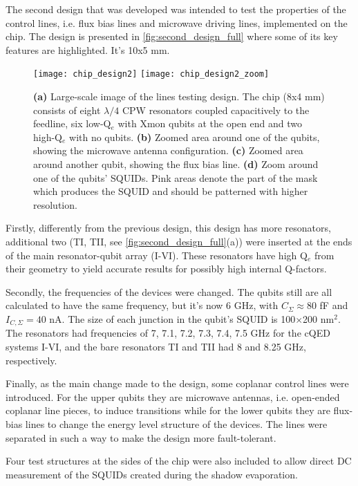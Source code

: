 \documentclass[12pt, twoside]{report}
\numberwithin{equation}{section}
\begin{document}
The second design that was developed was intended to test the properties of the control lines, i.e. flux bias lines and microwave driving lines, implemented on the chip. The design is presented in \autoref{fig:second_design_full} where some of its key features are highlighted. It's 10x5 mm.

\begin{figure}[h!]
\centering
\texttt{[image: chip\_design2]}
\texttt{[image: chip\_design2\_zoom]}
\caption{\textbf{(a)} Large-scale image of the lines testing design. The chip (8x4 mm) consists of eight $\lambda/4$ CPW resonators coupled capacitively to the feedline, six low-Q$_e$ with Xmon qubits at the open end and two high-Q$_e$ with no qubits. \textbf{(b)} Zoomed area around one of the qubits, showing the microwave antenna configuration. \textbf{(c)} Zoomed area around another qubit, showing the flux bias line. \textbf{(d)} Zoom around one of the qubits' SQUIDs. Pink areas denote the part of the mask which produces the SQUID and should be patterned with higher resolution.}
\label{fig:second_design_full}
\end{figure}

Firstly, differently from the previous design, this design has more resonators, additional two (TI, TII, see \autoref{fig:second_design_full}(a)) were inserted at the ends of the main resonator-qubit array (I-VI). These resonators have high Q$_e$ from their geometry to yield accurate results for possibly high internal Q-factors.

Secondly, the frequencies of the devices were changed. The qubits still are all calculated to have the same frequency, but it's now 6 GHz, with $C_\Sigma \approx 80$ fF and $I_{C, \Sigma} = 40$ nA. The size of each junction in the qubit's SQUID is 100$\times$200 nm$^2$. The resonators had frequencies of 7, 7.1, 7.2, 7.3, 7.4, 7.5 GHz for the cQED systems I-VI, and the bare resonators TI and TII had 8 and 8.25 GHz, respectively.

Finally, as the main change made to the design, some coplanar control lines were introduced. For the upper qubits they are microwave antennas, i.e. open-ended coplanar line pieces, to induce transitions while for the lower qubits they are flux-bias lines to change the energy level structure of the devices. The lines were separated in such a way to make the design more fault-tolerant.

Four test structures at the sides of the chip were also included to allow direct DC measurement of the SQUIDs created during the shadow evaporation.
\end{document}
